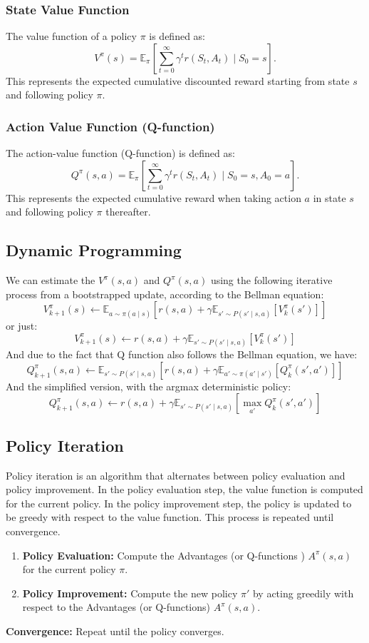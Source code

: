 \documentclass[a4paper,12pt]{article}
\begin{document}
\subsubsection{State Value Function}
The value function of a policy $\pi$ is defined as:
\[
V^\pi(s) = \mathbb{E}_\pi \left[ \sum_{t=0}^{\infty} \gamma^t r(S_t, A_t) \mid S_0 = s \right].
\]
This represents the expected cumulative discounted reward starting from state $s$ and following policy $\pi$.

\subsubsection{Action Value Function (Q-function)}
The action-value function (Q-function) is defined as:
\[
Q^\pi(s, a) = \mathbb{E}_\pi \left[ \sum_{t=0}^{\infty} \gamma^t r(S_t, A_t) \mid S_0 = s, A_0 = a \right].
\]
This represents the expected cumulative reward when taking action $a$ in state $s$ and following policy $\pi$ thereafter.

\subsection{Dynamic Programming}
We can estimate the $V^\pi(s, a)$ and $Q^\pi(s, a)$ using the following iterative process from a bootstrapped update, according to the Bellman equation:
\[
V^\pi_{k+1}(s) \leftarrow \mathbb{E}_{a \sim \pi(a \mid s)} \left[ r(s,a) + \gamma \mathbb{E}_{s' \sim P(s' \mid s, a)} \left[ V^\pi_k(s') \right] \right] 
\]
or just:
\[
V^\pi_{k+1}(s) \leftarrow r(s,a) + \gamma \mathbb{E}_{s' \sim P(s' \mid s, a)} \left[ V^\pi_k(s') \right] 
\]
And due to the fact that Q function also follows the Bellman equation, we have:
\[
Q^\pi_{k+1}(s, a) \leftarrow \mathbb{E}_{s' \sim P(s' \mid s, a)} \left[ r(s,a) + \gamma \mathbb{E}_{a' \sim \pi(a' \mid s')} \left[ Q^\pi_k(s', a') \right] \right] 
\]
And the simplified version, with the argmax deterministic policy:
\[
Q^\pi_{k+1}(s, a) \leftarrow r(s,a) + \gamma \mathbb{E}_{s' \sim P(s' \mid s, a)} \left[ \max_{a'} Q^\pi_k(s', a') \right]
\]
\subsection{Policy Iteration}
Policy iteration is an algorithm that alternates between policy evaluation and policy improvement. In the policy evaluation step, the value function is computed for the current policy. In the policy improvement step, the policy is updated to be greedy with respect to the value function. This process is repeated until convergence.
\begin{enumerate}
    \item \textbf{Policy Evaluation:} Compute the Advantages (or Q-functions ) $A^\pi(s,a)$ for the current policy $\pi$.
    \item \textbf{Policy Improvement:} Compute the new policy $\pi'$ by acting greedily with respect to the Advantages (or Q-functions) $A^\pi(s,a)$.
\end{enumerate}
\textbf{Convergence:} Repeat until the policy converges.
\end{document}

